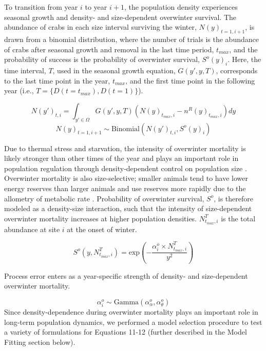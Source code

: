 \documentclass{article}
\begin{document}
To transition from year $i$ to year $i+1$, the population density experiences seasonal growth and density- and size-dependent overwinter survival. The abundance of crabs in each size interval surviving the winter, $N(y)_{t=1,i+1}$, is drawn from a binomial distribution, where the number of trials is the abundance of crabs after seasonal growth and removal in the last time period, $t_{max}$, and the probability of success is the probability of overwinter survival, $S^o(y)_i$. Here, the time interval, $T$, used in the seasonal growth equation, $G(y',y,T)$, corresponds to the last time point in the year, $t_{max}$, and the first time point in the following year (i.e., $T=\{D(t=t_{max}), D(t=1)\}$). 

\begin{equation}
N(y')_{t,i} = \int_{y' \in \Omega} G(y',y, T) (N(y)_{t_{max},i} - n^R(y)_{t_{max},i})dy
\end{equation}
\begin{equation}
N(y)_{t=1,i+1} \sim \text{Binomial}\left( N(y')_{t,i},  S^o(y)_i\right)
\end{equation}

Due to thermal stress and starvation, the intensity of overwinter mortality is likely stronger than other times of the year and plays an important role in population regulation through density-dependent control on population size \parencite{henderson1988size}. Overwinter mortality is also size-selective; smaller animals tend to have lower energy reserves than larger animals and use reserves more rapidly due to the allometry of metabolic rate \parencite{hurst2007causes}. Probability of overwinter survival, $S^o$, is therefore modeled as a density-size interaction, such that the intensity of size-dependent overwinter mortality increases at higher population densities. $N^T_{t_{max},i}$ is the total abundance at site $i$ at the onset of winter.

\begin{equation}
S^o(y,N^T_{t_{max},i}) = \text{exp}\left(-\frac{\alpha_i^o \times N^T_{t_{max},i}}{y^2}\right)
\end{equation}

Process error enters as a year-specific strength of density- and size-dependent overwinter mortality.

\begin{equation}
\alpha^o_i \sim \text{Gamma}(\alpha^o_{\alpha}, \alpha^o_{\theta})
\end{equation}
Since density-dependence during overwinter mortality plays an important role in long-term population dynamics, we performed a model selection procedure to test a variety of formulations for Equations 11-12 (further described in the Model Fitting section below).
\end{document}
